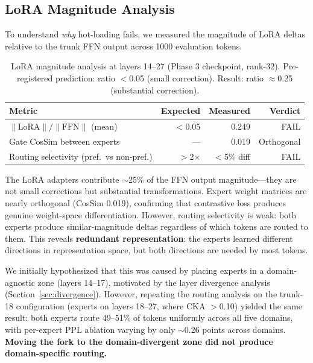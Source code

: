 \documentclass{article}
\begin{document}
\subsection{LoRA Magnitude Analysis}
\label{sec:magnitude}

To understand \emph{why} hot-loading fails, we measured the magnitude of LoRA
deltas relative to the trunk FFN output across 1000 evaluation tokens.

\begin{table}[h]
\centering
\caption{LoRA magnitude analysis at layers 14--27 (Phase 3 checkpoint,
rank-32). Pre-registered prediction: ratio $<$0.05 (small correction).
Result: ratio $\approx$0.25 (substantial correction).}
\label{tab:magnitude}
\begin{tabular}{@{}lrrr@{}}
\toprule
Metric & Expected & Measured & Verdict \\
\midrule
$\|\text{LoRA}\| / \|\text{FFN}\|$ (mean) & $<$0.05 & 0.249 & FAIL \\
Gate CosSim between experts & --- & 0.019 & Orthogonal \\
Routing selectivity (pref.\ vs non-pref.) & $>$2$\times$ & $<$5\% diff & FAIL \\
\bottomrule
\end{tabular}
\end{table}

The LoRA adapters contribute $\sim$25\% of the FFN output magnitude---they
are not small corrections but substantial transformations. Expert weight
matrices are nearly orthogonal (CosSim 0.019), confirming that contrastive
loss produces genuine weight-space differentiation. However, routing
selectivity is weak: both experts produce similar-magnitude deltas regardless
of which tokens are routed to them. This reveals \textbf{redundant representation}: the experts learned different
directions in representation space, but both directions are needed by most
tokens.

We initially hypothesized that this was caused by placing experts in a
domain-agnostic zone (layers 14--17), motivated by the layer divergence
analysis (Section~\ref{sec:divergence}). However, repeating the routing
analysis on the trunk-18 configuration (experts on layers 18--27, where CKA
$>$0.10) yielded the same result: both experts route 49--51\% of tokens
uniformly across all five domains, with per-expert PPL ablation varying by
only $\sim$0.26 points across domains. \textbf{Moving the fork to the
domain-divergent zone did not produce domain-specific routing.}
\end{document}
